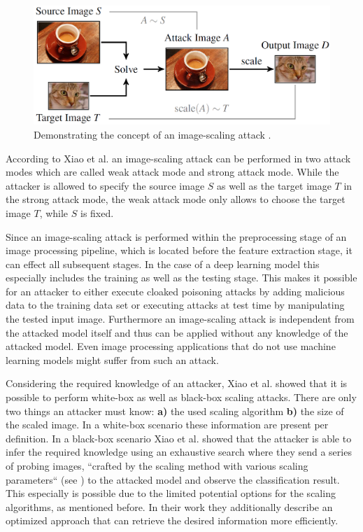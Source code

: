 \documentclass[sigconf]{acmart}
\begin{document}
\begin{figure}[h]
  \centering
  \includegraphics[width=\linewidth]{img/img_scale_concept.png}
  \caption{Demonstrating the concept of an image-scaling attack \cite{imgscale}.}
  \Description{}
  \label{fig:conc}
\end{figure}

According to Xiao et al.\cite{camouflage} an image-scaling attack can be performed in two attack modes which are called weak attack mode and strong attack mode.
While the attacker is allowed to specify the source image $S$ as well as the target image $T$ in the strong attack mode, the weak attack mode only allows to choose the target image $T$, while $S$ is fixed.

Since an image-scaling attack is performed within the preprocessing stage of an image processing pipeline, which is located before the feature extraction stage, it can effect all subsequent stages.
In the case of a deep learning model this especially includes the training as well as the testing stage.
This makes it possible for an attacker to either execute cloaked poisoning attacks by adding malicious data to the training data set or executing attacks at test time by manipulating the tested input image.
Furthermore an image-scaling attack is independent from the attacked model itself and thus can be applied without any knowledge of the attacked model.
Even image processing applications that do not use machine learning models might suffer from such an attack.

Considering the required knowledge of an attacker, Xiao et al. showed that it is possible to perform white-box  as well as black-box scaling attacks.
There are only two things an attacker must know:
 \textbf{a)} the used scaling algorithm
 \textbf{b)} the size of the scaled image.
In a white-box scenario these information are present per definition.
In a black-box scenario Xiao et al. showed that the attacker is able to infer the required knowledge using an exhaustive search where they send a series of probing images, ``crafted by the scaling method with various scaling parameters`` (see \cite{camouflage}) to the attacked model and observe the classification result.
This especially is possible due to the limited potential options for the scaling algorithms, as mentioned before.
In their work they additionally describe an optimized approach that can retrieve the desired information more efficiently.
\end{document}
